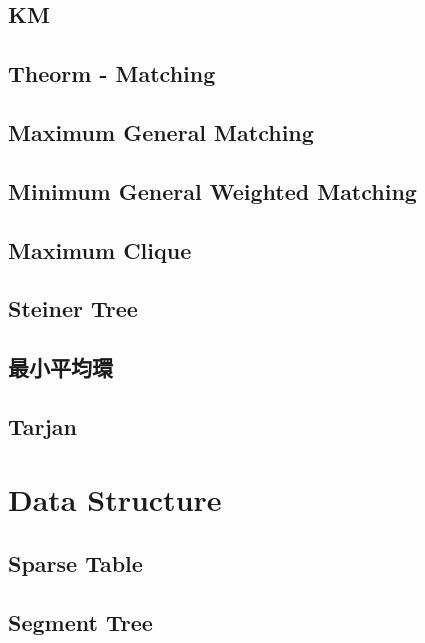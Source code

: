 \subsection{KM}

\subsection{Theorm - Matching}

\subsection{Maximum General Matching}

\subsection{Minimum General Weighted Matching}

\subsection{Maximum Clique}

\subsection{Steiner Tree}

\subsection{最小平均環}

\subsection{Tarjan}



\section{Data Structure}

\subsection{Sparse Table}

\subsection{Segment Tree}

